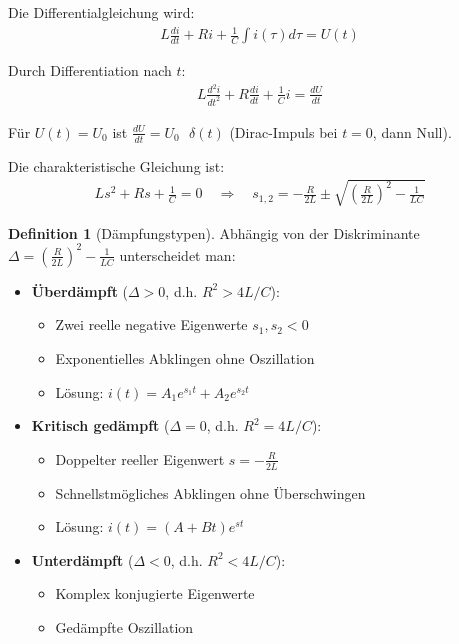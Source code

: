 ﻿\documentclass[a4paper,12pt]{report}
\theoremstyle{definition}
\newtheorem{definition}{Definition}
\begin{document}
	Die Differentialgleichung wird:
	\begin{align}
		L \frac{di}{dt} + R i + \frac{1}{C} \int i(\tau) d\tau = U(t)
	\end{align}
	
	Durch Differentiation nach $t$:
	\begin{align}
		L \frac{d^2i}{dt^2} + R \frac{di}{dt} + \frac{1}{C} i = \frac{dU}{dt}
	\end{align}
	
	Für $U(t) = U_0$ ist $\frac{dU}{dt} = U_0 \text{ } \delta(t)$ (Dirac-Impuls bei $t=0$, dann Null).
	
	Die charakteristische Gleichung ist:
	\begin{align}
		L s^2 + R s + \frac{1}{C} = 0 \quad \Rightarrow \quad s_{1,2} = -\frac{R}{2L} \pm \sqrt{\left(\frac{R}{2L}\right)^2 - \frac{1}{LC}}
	\end{align}
	
	\begin{definition}[Dämpfungstypen]
		Abhängig von der Diskriminante $\Delta = \left(\frac{R}{2L}\right)^2 - \frac{1}{LC}$ unterscheidet man:
		
		\begin{itemize}
			\item[-] \textbf{Überdämpft} ($\Delta > 0$, d.h. $R^2 > 4L/C$): 
			\begin{itemize}
				\item[-] Zwei reelle negative Eigenwerte $s_1, s_2 < 0$
				\item[-] Exponentielles Abklingen ohne Oszillation
				\item[-] Lösung: $i(t) = A_1 e^{s_1 t} + A_2 e^{s_2 t}$
			\end{itemize}
			
			\item[-] \textbf{Kritisch gedämpft} ($\Delta = 0$, d.h. $R^2 = 4L/C$): 
			\begin{itemize}
				\item[-] Doppelter reeller Eigenwert $s = -\frac{R}{2L}$
				\item[-] Schnellstmögliches Abklingen ohne Überschwingen
				\item[-] Lösung: $i(t) = (A + Bt) e^{st}$
			\end{itemize}
			
			\item[-] \textbf{Unterdämpft} ($\Delta < 0$, d.h. $R^2 < 4L/C$): 
			\begin{itemize}
				\item[-] Komplex konjugierte Eigenwerte
				\item[-] Gedämpfte Oszillation
			\end{itemize}
		\end{itemize}
	\end{definition}
	
\end{document}
